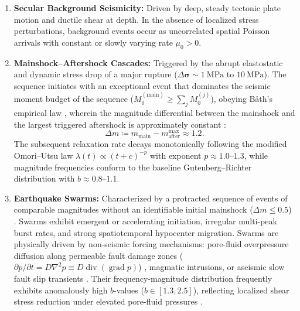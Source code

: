 \begin{enumerate}[label=(\alph*),leftmargin=2em]
  \item \textbf{Secular Background Seismicity:} Driven by deep,
    steady tectonic plate motion and ductile shear at depth. In the
    absence of localized stress perturbations, background events
    occur as uncorrelated spatial Poisson arrivals \parencite{gardner1974}
    with constant or slowly varying rate $\mu_0 > 0$.
  \item \textbf{Mainshock--Aftershock Cascades:} Triggered by the
    abrupt elastostatic and dynamic stress drop of a major rupture
    ($\Delta\bm{\sigma} \sim \qty{1}{\mega\pascal}$ to
    $\qty{10}{\mega\pascal}$). The sequence initiates with an
    exceptional event that dominates the seismic moment budget of
    the sequence ($M_0^{(\mathrm{main})} \ge \sum_j M_0^{(j)}$),
    obeying B\r{a}th's empirical law \parencite{bath1965,richter1958},
    wherein the magnitude differential between the mainshock and
    the largest triggered aftershock is approximately constant
    \parencite{shcherbakov2004,helmstetter2003bath,console2003}:
    \begin{equation}
      \Delta m \coloneqq m_{\mathrm{main}} -
      m_{\mathrm{after}}^{\max} \approx \num{1.2}.
      \label{eq:baths_law}
    \end{equation}
    The subsequent relaxation rate decays monotonically following
    the modified Omori--Utsu law $\lambda(t) \propto (t + c)^{-p}$
    \parencite{omori1894,utsu1961,utsu1995} with exponent
    $p \approx \numrange{1.0}{1.3}$, while magnitude frequencies conform
    to the baseline Gutenberg--Richter distribution
    \parencite{ishimoto1939,gutenberg1944} with $b \approx
    \numrange{0.8}{1.1}$.
  \item \textbf{Earthquake Swarms:} Characterized by a protracted
    sequence of events of comparable magnitudes without an
    identifiable initial mainshock ($\Delta m \le \num{0.5}$)
    \parencite{mogi1963,sykes1970,vidale2006}. Swarms
    exhibit emergent or accelerating initiation, irregular
    multi-peak burst rates, and strong spatiotemporal hypocenter
    migration. Swarms are physically driven by non-seismic forcing
    mechanisms: pore-fluid overpressure diffusion along permeable
    fault damage zones ($\partial p/\partial t = D\nabla^2 p \equiv
    D\operatorname{div}(\operatorname{grad} p)$)
    \parencite{nur1972,shapiro1997,shapiro2002}, magmatic intrusions,
    or aseismic slow fault slip transients \parencite{hainzl2005}.
    Their frequency-magnitude distribution frequently exhibits
    anomalously high $b$-values ($b \in [\num{1.3}, \num{2.5}]$), reflecting
    localized shear stress reduction under elevated pore-fluid pressures
    \parencite{scholz1968,wiemer2002}.
\end{enumerate}

